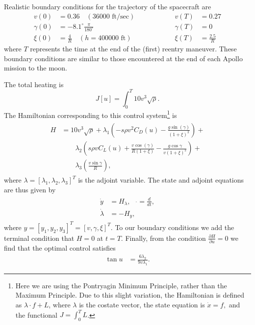 Realistic boundary conditions for the trajectory of the spacecraft are
\begin{equation}
  \begin{split}
    v(0) &= 0.36 \quad (36000 \text{ ft/sec})\\
    \gamma(0) &= -8.1^\circ \frac{\pi}{180^\circ}\\
    \xi(0)&= \frac{4}{R}\quad (h = 400000 \text{ ft})
  \end{split} 
\quad \quad \quad \quad \quad
  \begin{split}
    v(T) &= 0.27\\
    \gamma(T) &= 0 \\
	\xi(T)&= \frac{2.5}{R}
  \end{split} \label{eqn:reentry:BCs}
\end{equation}
where $T$ represents the time at the end of the (first) reentry maneuver. 
These boundary conditions are similar to those encountered at the end of each Apollo mission to the moon. 

The total heating is 
\[
J[u] = \int_0^T 10 v^3 \sqrt{\rho}.
\]
The Hamiltonian corresponding to this control system\footnote{Here we are using the Pontryagin Minimum Principle, rather than the Maximum Principle. Due to this slight variation, the Hamiltonian is defined as  $\lambda  \cdot f + L$, where $\lambda$ is the costate vector, the state equation is $\dot{x} = f,$ and the functional $J = \int_0^T L$.} is 
\begin{align}
	\begin{split}
H &=  10v^3 \sqrt{\rho} + \lambda_1 \left ( -s\rho v^2C_D(u) - \frac{g\sin(\gamma)}{(1+\xi)^2} \right) + \\ 
&{ }\quad \quad\lambda_2 \left( s \rho v C_L(u) + \frac{v \cos(\gamma)}{R(1+\xi)} - \frac{g \cos \gamma}{v(1+\xi)^2} \right) + \\
&{ }\quad \quad \lambda_3 \left( \frac{v \sin \gamma}{R} \right),
	\end{split}
\end{align}
where $\lambda = [\lambda_1,\lambda_2,\lambda_3]^T$ is the adjoint variable. 
The state and adjoint equations are thus given by 
\begin{align}
\begin{split}
	\dot{y} &= H_{\lambda},\quad \dot{} = \frac{d}{dt},\\
	\dot{\lambda} &= -H_{y}, \label{eqn:reentry:full_system}
\end{split}
\end{align}
where $y = [y_1,y_2,y_3]^T = [v,\gamma, \xi]^T$.
To our boundary conditions we add the terminal condition that $H = 0$ at $t = T$. 
Finally, from the condition $\frac{\partial H}{\partial u} = 0$ we find that the optimal control satisfies 
\begin{align}
\tan u &= \frac{6\lambda_2}{9v\lambda_1}.
\end{align}

